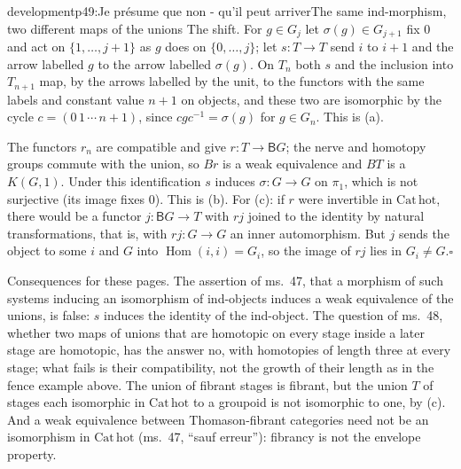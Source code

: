 \begin{dcomment}{development}{p49:Je présume que non - qu'il peut arriver}{The same ind-morphism, two different maps of the unions}
The shift. For $g\in G_j$ let $\sigma(g)\in G_{j+1}$ fix $0$ and act on $\{1,\dots,j+1\}$ as $g$ does on $\{0,\dots,j\}$; let $s:T\to T$ send $i$ to $i+1$ and the arrow labelled $g$ to the arrow labelled $\sigma(g)$. On $T_n$ both $s$ and the inclusion into $T_{n+1}$ map, by the arrows labelled by the unit, to the functors with the same labels and constant value $n+1$ on objects, and these two are isomorphic by the cycle $c=(0\,1\,\cdots\,n+1)$, since $cgc^{-1}=\sigma(g)$ for $g\in G_n$. This is (a).

The functors $r_n$ are compatible and give $r:T\to\mathsf BG$; the nerve and homotopy groups commute with the union, so $Br$ is a weak equivalence and $BT$ is a $K(G,1)$. Under this identification $s$ induces $\sigma:G\to G$ on $\pi_1$, which is not surjective (its image fixes $0$). This is (b). For (c): if $r$ were invertible in $\mathrm{Cat}\,\mathrm{hot}$, there would be a functor $j:\mathsf BG\to T$ with $rj$ joined to the identity by natural transformations, that is, with $rj:G\to G$ an inner automorphism. But $j$ sends the object to some $i$ and $G$ into $\operatorname{Hom}(i,i)=G_i$, so the image of $rj$ lies in $G_i\neq G$.\hfill$\square$

Consequences for these pages. The assertion of ms.~47, that a morphism of such systems inducing an isomorphism of ind-objects induces a weak equivalence of the unions, is false: $s$ induces the identity of the ind-object. The question of ms.~48, whether two maps of unions that are homotopic on every stage inside a later stage are homotopic, has the answer no, with homotopies of length three at every stage; what fails is their compatibility, not the growth of their length as in the fence example above. The union of fibrant stages is fibrant, but the union $T$ of stages each isomorphic in $\mathrm{Cat}\,\mathrm{hot}$ to a groupoid is not isomorphic to one, by (c). And a weak equivalence between Thomason-fibrant categories need not be an isomorphism in $\mathrm{Cat}\,\mathrm{hot}$ (ms.~47, ``sauf erreur''): fibrancy is not the envelope property.
\end{dcomment}

